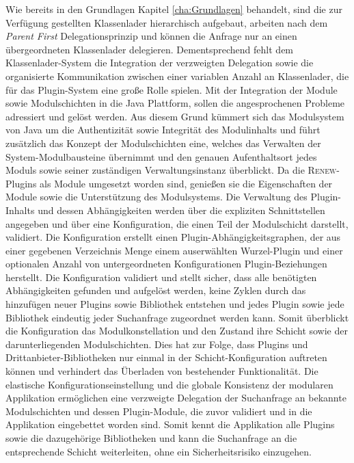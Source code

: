 	Wie bereits in den Grundlagen Kapitel \ref{cha:Grundlagen} behandelt, sind die zur Verfügung gestellten Klassenlader hierarchisch aufgebaut, arbeiten nach dem \textit{Parent First} Delegationsprinzip und können die Anfrage nur an einen übergeordneten Klassenlader delegieren. Dementsprechend fehlt dem Klassenlader-System die Integration der verzweigten Delegation sowie die organisierte Kommunikation zwischen einer variablen Anzahl an Klassenlader, die für das Plugin-System eine große Rolle spielen.\newline
	Mit der Integration der Module sowie Modulschichten in die Java Plattform, sollen die angesprochenen Probleme adressiert und gelöst werden. Aus diesem Grund kümmert sich das Modulsystem von Java um die Authentizität sowie Integrität des Modulinhalts und führt zusätzlich das Konzept der Modulschichten eine, welches das Verwalten der System-Modulbausteine übernimmt und den genauen Aufenthaltsort jedes Moduls sowie seiner zuständigen Verwaltungsinstanz überblickt. Da die \textsc{Renew}-Plugins als Module umgesetzt worden sind, genießen sie die Eigenschaften der Module sowie die Unterstützung des Modulsystems.\newline
	Die Verwaltung des Plugin-Inhalts und dessen Abhängigkeiten werden über die expliziten Schnittstellen angegeben und über eine Konfiguration, die einen Teil der Modulschicht darstellt, validiert. Die Konfiguration erstellt einen Plugin-Abhängigkeitsgraphen, der aus einer gegebenen Verzeichnis Menge einem auserwählten Wurzel-Plugin und einer optionalen Anzahl von untergeordneten Konfigurationen Plugin-Beziehungen herstellt. Die Konfiguration validiert und stellt sicher, dass alle benötigten Abhängigkeiten gefunden und aufgelöst werden, keine Zyklen durch das hinzufügen neuer Plugins sowie Bibliothek entstehen und jedes Plugin sowie jede Bibliothek eindeutig jeder Suchanfrage zugeordnet werden kann. Somit überblickt die Konfiguration das Modulkonstellation und den Zustand ihre Schicht sowie der darunterliegenden Modulschichten. Dies hat zur Folge, dass Plugins und Drittanbieter-Bibliotheken nur einmal in der Schicht-Konfiguration auftreten können und verhindert das Überladen von bestehender Funktionalität.\newline
	Die elastische Konfigurationseinstellung und die globale Konsistenz der modularen Applikation ermöglichen eine verzweigte Delegation der Suchanfrage an bekannte Modulschichten und dessen Plugin-Module, die zuvor validiert und in die Applikation eingebettet worden sind. Somit kennt die Applikation alle Plugins sowie die dazugehörige Bibliotheken und kann die Suchanfrage an die entsprechende Schicht weiterleiten, ohne ein Sicherheitsrisiko einzugehen.\newline
